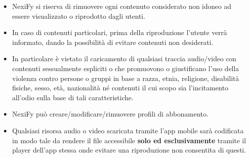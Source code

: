 \begin{itemize}
\item NexiFy si riserva di rimuovere ogni contenuto considerato non idoneo ad essere visualizzato o riprodotto dagli utenti.
\item In caso di contenuti particolari, prima della riproduzione l'utente verrà informato, dando la possibilità di evitare contenuti non desiderati.
\item In particolare è vietato il caricamento di qualsiasi traccia audio/video con contenuti sessualmente espliciti o che promuovono o giustificano l'uso della violenza contro persone o gruppi in base a razza, etnia, religione, disabilità fisiche, sesso, età, nazionalità né contenuti il cui scopo sia l'incitamento all'odio sulla base di tali caratteristiche. 
\item NexiFy può creare/modificare/rimuovere profili di abbonamento. 
\item Qualsiasi risorsa audio o video scaricata tramite l'app mobile sarà codificata in modo tale da rendere il file accessibile \textbf{solo ed esclusivamente} tramite il player dell'app stessa onde evitare una riproduzione non consentita di questi.
\end{itemize}
 

